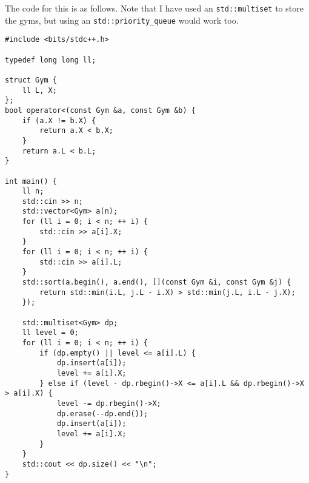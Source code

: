 \documentclass{article}
\begin{document}
The code for this is as follows. Note that I have used an \texttt{std::multiset} to store the gyms, but using an \texttt{std::priority\_queue} would work too.
\begin{verbatim}
#include <bits/stdc++.h>

typedef long long ll;

struct Gym {
    ll L, X;
};
bool operator<(const Gym &a, const Gym &b) {
    if (a.X != b.X) {
        return a.X < b.X;
    }
    return a.L < b.L;
}

int main() {
    ll n;
    std::cin >> n;
    std::vector<Gym> a(n);
    for (ll i = 0; i < n; ++ i) {
        std::cin >> a[i].X;
    }
    for (ll i = 0; i < n; ++ i) {
        std::cin >> a[i].L;
    }
    std::sort(a.begin(), a.end(), [](const Gym &i, const Gym &j) {
        return std::min(i.L, j.L - i.X) > std::min(j.L, i.L - j.X);
    });

    std::multiset<Gym> dp;
    ll level = 0;
    for (ll i = 0; i < n; ++ i) {
        if (dp.empty() || level <= a[i].L) {
            dp.insert(a[i]);
            level += a[i].X;
        } else if (level - dp.rbegin()->X <= a[i].L && dp.rbegin()->X > a[i].X) {
            level -= dp.rbegin()->X;
            dp.erase(--dp.end());
            dp.insert(a[i]);
            level += a[i].X;
        }
    }
    std::cout << dp.size() << "\n";
}
\end{verbatim}
\end{document}
